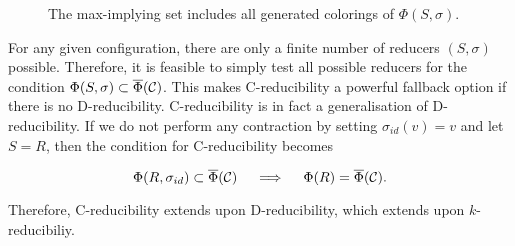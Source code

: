 \begin{figure}[!ht]
    \centering

    \caption{The max-implying set includes all generated colorings of $\Phi(S,\sigma)$.  }
    \label{fig:cred}
\end{figure}

For any given configuration, there are only a finite number of reducers $(S,\sigma)$ possible. Therefore, it is feasible to simply test all possible reducers for the condition $\Phi(S,\sigma) \subset \overline{\Phi}(\mathcal{C})$. This makes C-reducibility a powerful fallback option if there is no D-reducibility. C-reducibility is in fact a generalisation of D-reducibility. If we do not perform any contraction by setting $\sigma_{id}(v)=v$ and let $S=R$, then the condition for C-reducibility becomes

\begin{equation}
    \Phi(R,\sigma_{id}) \subset \overline{\Phi}(\mathcal{C})\quad\implies\quad \Phi(R) = \overline{\Phi}(\mathcal{C}).
\end{equation}

Therefore, C-reducibility extends upon D-reducibility, which extends upon $k$-reducibiliy.